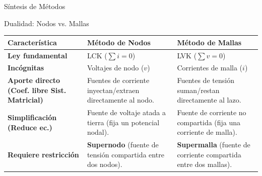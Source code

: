 \documentclass[10pt, aspectratio=169]{beamer}
\begin{document}
\begin{frame}{Síntesis de Métodos}
    \begin{boxTeoria}{Dualidad: Nodos vs. Mallas}
        \small
        \renewcommand{\arraystretch}{1.4}
        \begin{tabular}{p{3.2cm} p{4.8cm} p{4.8cm}}
            \textbf{Característica}                               & \textbf{Método de Nodos}                                           & \textbf{Método de Mallas}                                              \\
            \hline
            \textbf{Ley fundamental}                              & LCK ($\sum i = 0$)                                                 & LVK ($\sum v = 0$)                                                     \\
            \textbf{Incógnitas}                                   & Voltajes de nodo ($v$)                                             & Corrientes de malla ($i$)                                              \\
            \textbf{Aporte directo (Coef. libre Sist. Matricial)} & Fuentes de corriente inyectan/extraen directamente al nodo.        & Fuentes de tensión suman/restan directamente al lazo.                  \\
            \textbf{Simplificación (Reduce ec.)}                  & Fuente de voltaje atada a tierra (fija un potencial nodal).        & Fuente de corriente no compartida (fija una corriente de malla).       \\
            \textbf{Requiere restricción}                         & \textbf{Supernodo} (fuente de tensión compartida entre dos nodos). & \textbf{Supermalla} (fuente de corriente compartida entre dos mallas). \\
        \end{tabular}
    \end{boxTeoria}
\end{frame}
\end{document}
